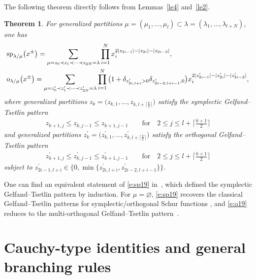 \documentclass[10pt,a4paper]{amsart}
\numberwithin{equation}{section}
\newtheorem{Theorem}{Theorem}[section]
\begin{document}
The following theorem directly follows from Lemmas~\ref{le4} and~\ref{le2}.
\begin{Theorem}
For generalized partitions $\mu=(\mu_1,\dots,\mu_l)\subset \lambda=(\lambda_1,\dots,\lambda_{l+N})$, one has
\begin{align}
\label{e:sp19}&{\rm sp}_{\lambda/\mu}\big(x^{\pm}\big) = \sum_{\mu=z_0\prec z_1\prec\dots\prec z_{2N}=\lambda}\prod^N_{i=1}x^{2|z_{2i-1}|-|z_{2i}|-|z_{2i-2}|}_i,\\
\label{e:o19}&{\rm o}_{\lambda/\mu}\big(x^{\pm}\big) = \sum_{\mu=z^{\prime}_0\prec z^{\prime}_1\prec\dots\prec z^{\prime}_{2N}=\lambda}\prod^N_{i=1}\big(1+\delta_{z^{\prime}_{2i,l+i}>0}\delta_{z^{\prime}_{2i-2,l+i-1},0}\big)x^{2|z^{\prime}_{2i-1}| -|z^{\prime}_{2i}|-|z^{\prime}_{2i-2}|}_i,
\end{align}
where generalized partitions $z_k=\big(z_{k,1},\dots,z_{k,l+\lceil\frac{k}{2}\rceil}\big)$ satisfy the symplectic Gelfand--Tsetlin pattern
\begin{align*}
z_{k+1,j}\leq z_{k,j-1}\leq z_{k+1,j-1}\qquad\text{for}\quad 2\leq j\leq l+\biggl\lceil \frac{k+1}{2}\biggr\rceil
\end{align*}
and generalized partitions $z^{\prime}_k=\big(z^{\prime}_{k,1},\dots,z^{\prime}_{k,l+\lceil\frac{ k}{2}\rceil}\big)$ satisfy the orthogonal Gelfand--Tsetlin pattern
\begin{align*}
z^{\prime}_{k+1,j}\leq z^{\prime}_{k,j-1}\leq z^{\prime}_{k+1,j-1}\qquad \text{for}\quad 2\leq j\leq l+\biggl\lceil\frac{k+1}{2}\biggr\rceil
\end{align*}
subject to $z^{\prime}_{2i-1,l+i}\in\big\{0,\min\big\{z^{\prime}_{2i,l+i},z^{\prime}_{2i-2,l+i-1}\big\}\big\}$.
\end{Theorem}
\begin{Remark}
One can find an equivalent statement of \eqref{e:sp19} in~\cite{AF2020}, which defined the symplectic Gelfand--Tsetlin pattern by induction. For $\mu=\varnothing$, \eqref{e:sp19} recovers the classical Gelfand--Tsetlin patterns for symplectic/orthogonal Schur functions \cite[p.~310]{Pro1994}, and \eqref{e:o19} reduces to the multi-orthogonal Gelfand--Tsetlin pattern~\cite[p.~324]{Pro1994}.
\end{Remark}

\section{Cauchy-type identities and general branching rules}\label{s5}
\end{document}
